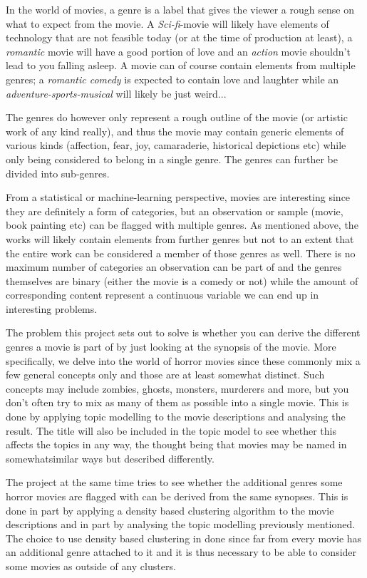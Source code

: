 \documentclass[11pt,a4paper]{article}
\begin{document}
In the world of movies, a genre is a label that gives the viewer a rough sense on what to expect from the movie. A \textit{Sci-fi}-movie will likely have elements of technology that are not feasible today (or at the time of production at least), a \textit{romantic} movie will have a good portion of love and an \textit{action} movie shouldn't lead to you falling asleep. A movie can of course contain elements from multiple genres; a \textit{romantic comedy} is expected to contain love and laughter while an \textit{adventure-sports-musical} will likely be just weird... 

The genres do however only represent a rough outline of the movie (or artistic work of any kind really), and thus the movie may contain generic elements of various kinds (affection, fear, joy, camaraderie, historical depictions etc) while only being considered to belong in a single genre. The genres can further be divided into sub-genres.

From a statistical or machine-learning perspective, movies are interesting since they are definitely a form of categories, but an observation or sample (movie, book painting etc) can be flagged with multiple genres. As mentioned above, the works will likely contain elements from further genres but not to an extent that the entire work can be considered a member of those genres as well. There is no maximum number of categories an observation can be part of and the genres themselves are binary (either the movie is a comedy or not) while the amount of corresponding content represent a continuous  variable we can end up in interesting problems. 

The problem this project sets out to solve is whether you can derive the different genres a movie is part of by just looking at the synopsis of the movie. More specifically, we delve into the world of horror movies since these commonly mix a few general concepts only and those are at least somewhat distinct. Such concepts may include zombies, ghosts, monsters, murderers and more, but you don't often try to mix as many of them as possible into a single movie. This is done by applying topic modelling to the movie descriptions and analysing the result. The title will also be included in the topic model to see whether this affects the topics in any way, the thought being that movies may be named in somewhatsimilar ways but described differently.

The project at the same time tries to see whether the additional genres some horror movies are flagged with can be derived from the same synopses. This is done in part by applying a density based clustering algorithm to the movie descriptions and in part by analysing the topic modelling previously mentioned. The choice to use density based clustering in done since far from every movie has an additional genre attached to it and it is thus necessary to be able to consider some movies as outside of any clusters.
\end{document}
